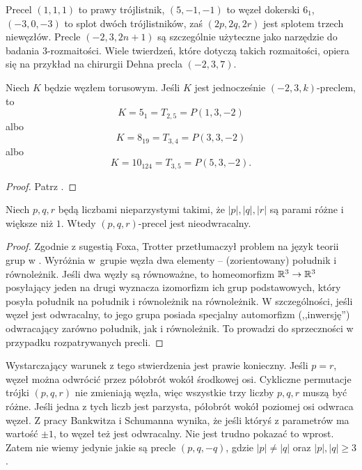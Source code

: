 Precel $(1,1,1)$ to prawy trójlistnik, $(5, -1, -1)$ to węzeł dokerski $6_1$, $(-3, 0, -3)$ to splot dwóch trójlistników, zaś $(2p, 2q, 2r)$ jest splotem trzech niewęzłów.
Precle $(-2, 3, 2n+1)$ są szczególnie użyteczne jako narzędzie do badania 3-rozmaitości.
Wiele twierdzeń, które dotyczą takich rozmaitości, opiera się na przykład na chirurgii Dehna precla $(-2, 3, 7)$.

\begin{proposition}
%
    Niech $K$ będzie węzłem torusowym.
    Jeśli $K$ jest jednocześnie $(-2, 3, k)$-preclem, to
    \begin{equation}
        K = 5_{1} = T_{2,5} = P(1, 3, -2)
    \end{equation}
    albo
    \begin{equation}
        K = 8_{19} = T_{3,4} = P(3, 3, -2)
    \end{equation}
    albo
    \begin{equation}
        K = 10_{124} = T_{3,5} = P(5, 3, -2).
    \end{equation}
\end{proposition}

\begin{proof}
    Patrz \cite{garoufalidis12}.
\end{proof}

\begin{proposition}
    \label{prp:pretzel_not_invertible}
    Niech $p, q, r$ będą liczbami nieparzystymi takimi, że $|p|, |q|, |r|$ są parami różne i większe niż $1$.
    Wtedy $(p, q, r)$-precel jest nieodwracalny.
\end{proposition}

\begin{proof}
    Zgodnie z sugestią Foxa, Trotter przetłumaczył problem na język teorii grup w \cite{trotter63}.
    Wyróżnia w~grupie węzła dwa elementy -- (zorientowany) południk i równoleżnik.
    Jeśli dwa węzły są równoważne, to homeomorfizm $\mathbb R^3 \to \mathbb R^3$ posyłający jeden na drugi wyznacza izomorfizm ich grup podstawowych, który posyła południk na południk i równoleżnik na równoleżnik.
    W szczególności, jeśli węzeł jest odwracalny, to jego grupa posiada specjalny automorfizm (,,inwersję'') odwracający zarówno południk, jak i równoleżnik.
    To prowadzi do sprzeczności w przypadku rozpatrywanych precli.
\end{proof}

Wystarczający warunek z tego stwierdzenia jest prawie konieczny.
Jeśli $p = r$, węzeł można odwrócić przez półobrót wokół środkowej osi.
Cykliczne permutacje trójki $(p, q, r)$ nie zmieniają węzła, więc wszystkie trzy liczby $p, q, r$ muszą być różne.
Jeśli jedna z tych liczb jest parzysta, półobrót wokół poziomej osi odwraca węzeł.
Z pracy Bankwitza i Schumanna wynika, że jeśli któryś z parametrów ma wartość $\pm 1$, to węzeł też jest odwracalny.
Nie jest trudno pokazać to wprost.
Zatem nie wiemy jedynie jakie są precle $(p, q, -q)$, gdzie $|p| \neq |q|$ oraz $|p|, |q| \ge 3$.

